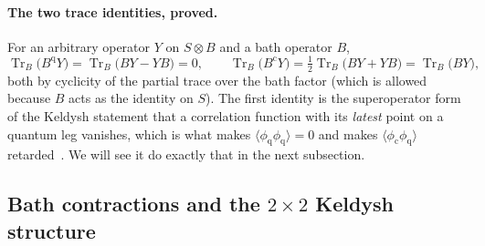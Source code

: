 \documentclass[11pt]{article}
\newcommand{\Tr}{\operatorname{Tr}}
\newcommand{\cl}{\mathrm{c}}
\newcommand{\qu}{\mathrm{q}}
\newcommand{\avg}[1]{\langle#1\rangle}
\begin{document}
\paragraph{The two trace identities, proved.}
For an arbitrary operator $Y$ on $S\otimes B$ and a bath operator $B$,
\begin{equation}
  \Tr_B\!\big(B^\qu Y\big)=\Tr_B\!\big(BY-YB\big)=0,\qquad
  \Tr_B\!\big(B^\cl Y\big)=\tfrac12\Tr_B\!\big(BY+YB\big)=\Tr_B\!\big(BY\big),
  \label{eq:trace-identities}
\end{equation}
both by cyclicity of the partial trace over the bath factor (which is allowed because
$B$ acts as the identity on $S$). The first identity is the superoperator form of
the Keldysh statement that a correlation function with its \emph{latest} point on a
quantum leg vanishes, which is what makes $\avg{\phi_\qu\phi_\qu}=0$ and makes
$\avg{\phi_\cl\phi_\qu}$ retarded~\cite{Kamenev2011}. We will see it do exactly that in the
next subsection.

\subsection{Bath contractions and the \texorpdfstring{$2\times2$}{2x2} Keldysh structure}
\label{sec:contractions}
\end{document}

